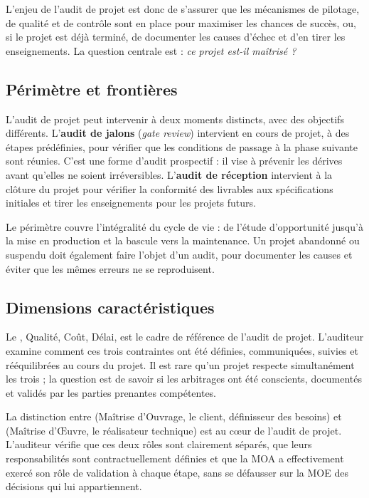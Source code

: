L'enjeu de l'audit de projet est donc de s'assurer que les mécanismes de pilotage, de qualité et de contrôle sont en place pour maximiser les chances de succès, ou, si le projet est déjà terminé, de documenter les causes d'échec et d'en tirer les enseignements. La question centrale est : \textit{ce projet est-il maîtrisé ?}

\subsection{Périmètre et frontières}

L'audit de projet peut intervenir à deux moments distincts, avec des objectifs différents. L'\textbf{audit de jalons} (\textit{gate review}) intervient en cours de projet, à des étapes prédéfinies, pour vérifier que les conditions de passage à la phase suivante sont réunies. C'est une forme d'audit prospectif : il vise à prévenir les dérives avant qu'elles ne soient irréversibles. L'\textbf{audit de réception} intervient à la clôture du projet pour vérifier la conformité des livrables aux spécifications initiales et tirer les enseignements pour les projets futurs.

Le périmètre couvre l'intégralité du cycle de vie : de l'étude d'opportunité jusqu'à la mise en production et la bascule vers la maintenance. Un projet abandonné ou suspendu doit également faire l'objet d'un audit, pour documenter les causes et éviter que les mêmes erreurs ne se reproduisent.

\subsection{Dimensions caractéristiques}

Le , Qualité, Coût, Délai, est le cadre de référence de l'audit de projet. L'auditeur examine comment ces trois contraintes ont été définies, communiquées, suivies et rééquilibrées au cours du projet. Il est rare qu'un projet respecte simultanément les trois ; la question est de savoir si les arbitrages ont été conscients, documentés et validés par les parties prenantes compétentes.

La distinction entre  (Maîtrise d'Ouvrage, le client, définisseur des besoins) et  (Maîtrise d'Œuvre, le réalisateur technique) est au cœur de l'audit de projet. L'auditeur vérifie que ces deux rôles sont clairement séparés, que leurs responsabilités sont contractuellement définies et que la MOA a effectivement exercé son rôle de validation à chaque étape, sans se défausser sur la MOE des décisions qui lui appartiennent.

